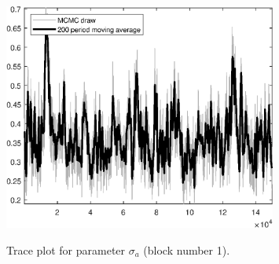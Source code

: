 \begin{figure}[H]
\centering
  \includegraphics[width=0.8\textwidth]{BRS_gen/graphs/TracePlot_sigma_a_blck_1}\\
    \caption{Trace plot for parameter ${\sigma_a}$ (block number 1).}
\end{figure}
